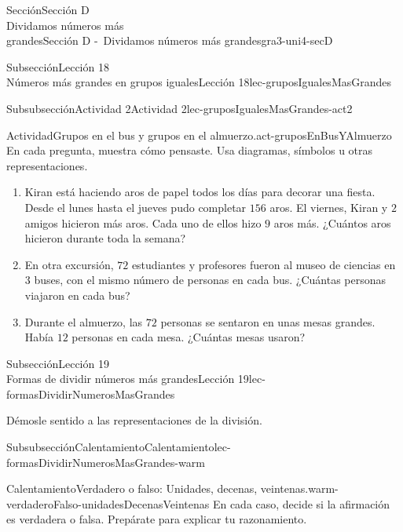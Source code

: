 \begin{sectionptx}{Sección}{{\Large Sección D\\}Dividamos números más\\grandes}{}{Sección D -~Dividamos números más grandes}{}{}{gra3-uni4-secD}
\begin{subsectionptx}{Subsección}{{\normalsize Lección 18\\[-0.05cm]}Números más grandes en grupos iguales}{}{Lección 18}{}{}{lec-gruposIgualesMasGrandes}
\typeout{************************************************}
%
\begin{subsubsectionptx}{Subsubsección}{Actividad 2}{}{Actividad 2}{}{}{lec-gruposIgualesMasGrandes-act2}
\begin{activity}{Actividad}{Grupos en el bus y grupos en el almuerzo.}{act-gruposEnBusYAlmuerzo}%
En cada pregunta, muestra cómo pensaste. Usa diagramas, símbolos u otras representaciones.%
%
\begin{enumerate}
\item{}Kiran está haciendo aros de papel todos los días para decorar una fiesta. Desde el lunes hasta el jueves pudo completar \(156\) aros. El viernes, Kiran y \(2\) amigos hicieron más aros. Cada uno de ellos hizo \(9\) aros más. ¿Cuántos aros hicieron durante toda la semana?%
\item{}En otra excursión, \(72\) estudiantes y profesores fueron al museo de ciencias en \(3\) buses, con el mismo número de personas en cada bus. ¿Cuántas personas viajaron en cada bus?%
\item{}Durante el almuerzo, las \(72\) personas se sentaron en unas mesas grandes. Había \(12\) personas en cada mesa. ¿Cuántas mesas usaron?%
\end{enumerate}
\end{activity}%
\end{subsubsectionptx}
\end{subsectionptx}
%
%
\typeout{************************************************}
\typeout{************************************************}
%
\begin{subsectionptx}{Subsección}{{\normalsize Lección 19\\[-0.05cm]}Formas de dividir números más grandes}{}{Lección 19}{}{}{lec-formasDividirNumerosMasGrandes}
\begin{introduction}{}%
Démosle sentido a las representaciones de la división.%
\end{introduction}%
%
%
\typeout{************************************************}
\typeout{************************************************}
%
\begin{subsubsectionptx}{Subsubsección}{Calentamiento}{}{Calentamiento}{}{}{lec-formasDividirNumerosMasGrandes-warm}
\begin{exploration}{Calentamiento}{Verdadero o falso: Unidades, decenas, veintenas.}{warm-verdaderoFalso-unidadesDecenasVeintenas}%
En cada caso, decide si la afirmación es verdadera o falsa. Prepárate para explicar tu razonamiento.%

\end{exploration}
\end{subsubsectionptx}
\end{subsectionptx}
\end{sectionptx}
